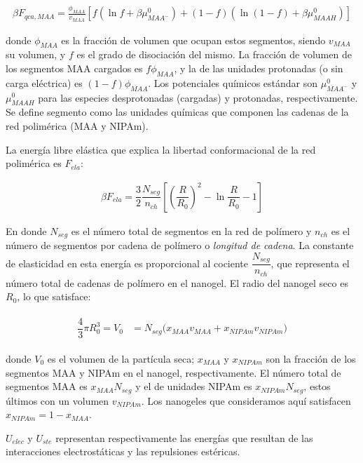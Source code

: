 	
	\begin{align}
		\beta F_{qca, MAA} =  \frac{\phi_{MAA}}{v_{MAA}} \left[f(\ln f+ \beta\mu^0_{MAA^-}) +(1-f)(\ln (1-f)+\beta\mu^0_{MAAH})\right]
	\end{align}
	
	
	\noindent donde $\phi_{MAA}$ es la fracci\'on de volumen que ocupan estos segmentos, siendo $v_{MAA}$ su volumen, y $f$ es el grado de disociaci\'on del mismo. 
	La fracci\'on de volumen de los segmentos MAA cargados es $f\phi_{MAA}$, y la de las unidades protonadas (o sin carga el\'ectrica) es $(1-f)\phi_{MAA}$.
	Los potenciales qu\'imicos est\'andar son $\mu^0_{MAA^-}$ y $\mu^0_{MAAH}$ para las especies desprotonadas (cargadas) y protonadas, respectivamente.
	Se define segmento como las unidades qu\'imicas que componen las cadenas de la red polim\'erica (MAA y NIPAm).
	
	
	La energ\'ia libre el\'astica que explica la libertad conformacional de la red polim\'erica es $F_{ela}$: 
	
	\begin{align}
		\beta F_{ela} = \dfrac{3}{2}\dfrac{N_{seg}}{n_{ch} }\left[\left(\dfrac{R}{R_0}\right)^2 - \ln\dfrac{R}{R_0} -1\right]
	\end{align}
	
	En donde $N_{seg}$ es el n\'umero total de segmentos en la red de pol\'imero y $n_{ch}$ es el n\'umero de segmentos por cadena de pol\'imero o \emph{longitud de cadena}.
	La constante de elasticidad en esta energ\'ia es proporcional al cociente $\dfrac{N_{seg}}{n_{ch}}$, que representa el n\'umero total de cadenas de pol\'imero en el nanogel.
	El radio del nanogel seco es $R_0$, lo que satisface:
	
	\begin{align}
		\begin{aligned} 
			\dfrac{4}{3}\pi R_0^3=V_0&=N_{seg}\Big( x_{MAA} v_{MAA} +x_{NIPAm} v_{NIPAm}\Big)
		\end{aligned}
	\end{align}
	
	
	\noindent donde $V_0$ es el volumen de la part\'icula seca; $x_{MAA}$ y $x_{NIPAm}$ son la fracci\'on de los segmentos MAA y NIPAm en el nanogel, respectivamente.
	El n\'umero total de segmentos MAA es $x_{MAA}N_{seg}$ y el de unidades NIPAm es $x_{NIPAm}N_{seg}$, estos \'ultimos con un volumen $v_{NIPAm}$.
	Los nanogeles que consideramos aqu\'i satisfacen $x_{NIPAm}=1-x_{MAA}$.
	
	
	$U_{elec}$ y $U_{ste}$ representan respectivamente las energ\'ias que resultan de las interacciones electrost\'aticas y las repulsiones est\'ericas.
	
